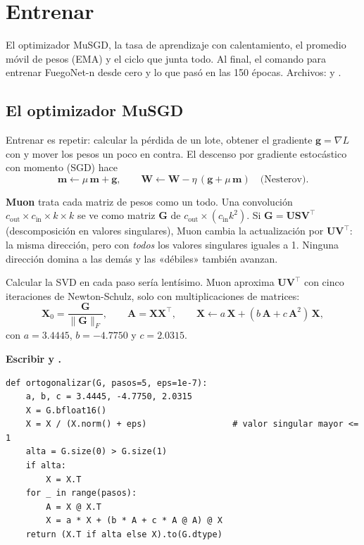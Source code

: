 \chapter{Entrenar}
\label{cap:entrenar}

\begin{enpocas}
El optimizador MuSGD, la tasa de aprendizaje con calentamiento, el promedio móvil
de pesos (EMA) y el ciclo que junta todo. Al final, el comando para entrenar
FuegoNet-n desde cero y lo que pasó en las 150 épocas. Archivos:
 y .
\end{enpocas}

\section{El optimizador MuSGD}

Entrenar es repetir: calcular la pérdida de un lote, obtener el gradiente
$\mathbf{g} = \nabla L$ con  y mover los pesos un poco en
contra. El descenso por gradiente estocástico con momento (SGD) hace
\begin{equation}
\mathbf{m} \leftarrow \mu\,\mathbf{m} + \mathbf{g},\qquad
\mathbf{W} \leftarrow \mathbf{W} - \eta\,(\mathbf{g} + \mu\,\mathbf{m})\quad\text{(Nesterov)}.
\end{equation}

\textbf{Muon} trata cada matriz de pesos como un todo. Una convolución
$c_{\text{out}}\times c_{\text{in}}\times k\times k$ se ve como matriz
$\mathbf{G}$ de $c_{\text{out}}\times(c_{\text{in}}k^2)$. Si
$\mathbf{G} = \mathbf{U}\mathbf{S}\mathbf{V}^\top$ (descomposición en valores
singulares), Muon cambia la actualización por $\mathbf{U}\mathbf{V}^\top$: la
misma dirección, pero con \emph{todos} los valores singulares iguales a 1. Ninguna
dirección domina a las demás y las «débiles» también avanzan.

Calcular la SVD en cada paso sería lentísimo. Muon aproxima
$\mathbf{U}\mathbf{V}^\top$ con cinco iteraciones de Newton-Schulz, solo con
multiplicaciones de matrices:
\begin{equation}
\mathbf{X}_0 = \frac{\mathbf{G}}{\|\mathbf{G}\|_F},\qquad
\mathbf{A} = \mathbf{X}\mathbf{X}^\top,\qquad
\mathbf{X} \leftarrow a\,\mathbf{X} + (b\,\mathbf{A} + c\,\mathbf{A}^2)\,\mathbf{X},
\end{equation}
con $a = 3.4445$, $b = -4.7750$ y $c = 2.0315$.

 \textbf{Escribir  y .}
\begin{lstlisting}[style=py]
def ortogonalizar(G, pasos=5, eps=1e-7):
    a, b, c = 3.4445, -4.7750, 2.0315
    X = G.bfloat16()
    X = X / (X.norm() + eps)                 # valor singular mayor <= 1
    alta = G.size(0) > G.size(1)
    if alta:
        X = X.T
    for _ in range(pasos):
        A = X @ X.T
        X = a * X + (b * A + c * A @ A) @ X
    return (X.T if alta else X).to(G.dtype)
\end{lstlisting}

